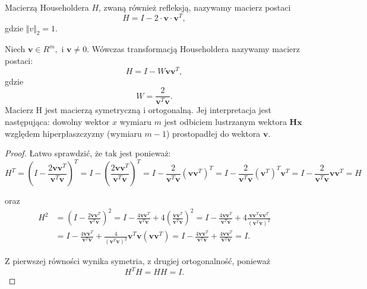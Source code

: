 \documentclass[12pt,a4paper]{report}
\newcommand{\vr}[1]{\mathbf{#1}}
\newcommand{\mx}[1]{{#1}}
\begin{document}
\begin{definition}
Macierzą Householdera $H$, zwaną również refleksją, nazywamy macierz postaci 
$$
\mx{H}=\mx{I}-2\cdot \vr{v}\cdot \vr{v}^{T},
$$
gdzie $\Vert v \Vert_{2} = 1$.
\end{definition}

\begin{theorem} 
Niech  $\vr{v}\in R^{m}, $ i $\vr{v}\neq 0. $ Wówczas transformacją Householdera nazywamy macierz postaci:
$$
\mx{H}=\mx{I}-W\vr{v}\vr{v}^{T},
$$
gdzie
$$
W={\frac {2}{\vr{v}^{T}\vr{v}}}.
$$ 
Macierz H jest macierzą symetryczną i ortogonalną. 
Jej interpretacja jest następująca: dowolny wektor $x$ wymiaru $m$ jest odbiciem lustrzanym wektora $\vr{Hx}$ względem hiperpłaszczyzny (wymiaru $m-1$) prostopadłej do wektora $\vr{v}$.
\end{theorem} 

\begin{proof}
Łatwo sprawdzić, że tak jest ponieważ: 
$$
\mx{H}^{T}=\left(\mx{I}-{\frac {2\vr{v}\vr{v}^{T}}{\vr{v}^{T}\vr{v}}}\right)^{T}
= \mx{I}-\left({\frac {2\vr{v}\vr{v}^{T}}{\vr{v}^{T}\vr{v}}}\right)^{T}
= \mx{I}-\frac {2}{\vr{v}^{T}\vr{v}} (\vr{v}\vr{v}^{T})^{T}
= \mx{I}-\frac {2}{\vr{v}^{T}\vr{v}} (\vr{v}^{T})^{T} \vr{v}^{T}
= \mx{I} - \frac{2}{\vr{v}^{T}\vr{v}} \vr{v}\vr{v}^{T} 
= \mx{H}
$$

oraz
\begin{align*}
\mx{H}^{2}  &=\left(\mx{I}-{\frac {2\vr{v}\vr{v}^{T}}{\vr{v}^{T}\vr{v}}}\right)^{2}  
= \mx{I}-{\frac {4\vr{v}\vr{v}^{T}}{\vr{v}^{T}\vr{v}}}+4\left({\frac {\vr{v}\vr{v}^{T}}{\vr{v}^{T}\vr{v}}}\right)^{2}  
=\mx{I} - \frac{4\vr{v}\vr{v}^{T}}{\vr{v}^{T}\vr{v}} + 4 \frac{\vr{v}\vr{v}^{T}\vr{v}\vr{v}^{T}}{(\vr{v}^{T}\vr{v})^{2}} \\
&=  \mx{I} - \frac{4\vr{v}\vr{v}^{T}}{\vr{v}^{T}\vr{v}} +  \frac{4}{(\vr{v}^{T}\vr{v})^{2}} \vr{v}^{T}\vr{v}(\vr{v}\vr{v}^{T})  
= \mx{I} - \frac{4\vr{v}\vr{v}^{T}}{\vr{v}^{T}\vr{v}} +  \frac{4\vr{v}\vr{v}^{T}}{\vr{v}^{T}\vr{v}}  = \mx{I}.
\end{align*}



Z pierwszej równości wynika symetria, z drugiej ortogonalność, ponieważ 
$$
\mx{H}^{T}\mx{H}=\mx{H}\mx{H}=\mx{I}.
$$ 
\end{proof} 
\end{document}
